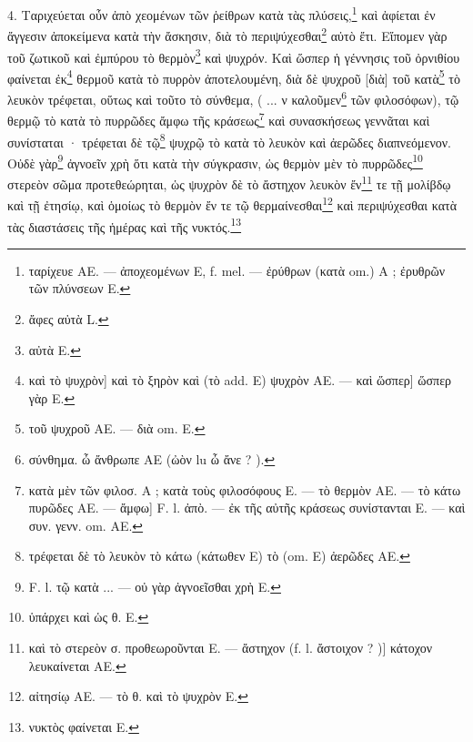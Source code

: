 \documentclass[a4paper, 11pt, oneside, polutonikogreek, french]{article}
\begin{document}
4. Ταριχεύεται οὖν ἀπὸ χεομένων τῶν ῥείθρων κατὰ τὰς πλύσεις,\footnote{ταρίχευε AE. --- ἀποχεομένων E, f. mel. --- ἐρύθρων (κατὰ om.) A ; ἐρυθρῶν τῶν πλύνσεων E.} καὶ ἀφίεται ἐν ἄγγεσιν ἀποκείμενα κατὰ τὴν ἄσκησιν, διὰ τὸ περιψύχεσθαι\footnote{ἄφες αὐτὰ L.} αὐτὸ ἔτι. Εἴπομεν γὰρ τοῦ ζωτικοῦ καὶ ἐμπύρου τὸ θερμὸν\footnote{αὐτὰ E.} καὶ ψυχρόν. Καὶ ὥσπερ ἡ γέννησις τοῦ ὀρνιθίου φαίνεται ἐκ\footnote{καὶ τὸ ψυχρὸν] καὶ τὸ ξηρὸν καὶ (τὸ add. E) ψυχρὸν AE. --- καὶ ὥσπερ] ὥσπερ γὰρ E.} θερμοῦ κατὰ τὸ πυρρὸν ἀποτελουμένη, διὰ δὲ ψυχροῦ [διὰ] τοῦ κατὰ\footnote{τοῦ ψυχροῦ AE. --- διὰ om. E.} τὸ λευκὸν τρέφεται, οὕτως καὶ τοῦτο τὸ σύνθεμα, ( ... ν καλοῦμεν\footnote{σύνθημα. ὦ ἄνθρωπε AE (ὠὸν lu ὦ ἄνε ? ).} τῶν φιλοσόφων), τῷ θερμῷ τὸ κατὰ τὸ πυρρῶδες ἄμφω τῆς κράσεως\footnote{κατὰ μὲν τῶν φιλοσ. A ; κατὰ τοὺς φιλοσόφους E. --- τὸ θερμὸν AE. --- τὸ κάτω πυρῶδες AE. --- ἄμφω] F. l. ἀπὸ. --- ἐκ τῆς αὐτῆς κράσεως συνίστανται E. --- καὶ συν. γενν. om. AE.} καὶ συνασκήσεως γεννᾶται καὶ συνίσταται · τρέφεται δὲ τῷ\footnote{τρέφεται δὲ τὸ λευκὸν τὸ κάτω (κάτωθεν E) τὸ (om. E) ἀερῶδες AE.} ψυχρῷ τὸ κατὰ τὸ λευκὸν καὶ ἀερῶδες διαπνεόμενον. Οὐδὲ γὰρ\footnote{F. l. τῷ κατὰ ... --- οὐ γὰρ ἀγνοεῖσθαι χρὴ E.} ἀγνοεῖν χρὴ ὅτι κατὰ τὴν σύγκρασιν, ὡς θερμὸν μὲν τὸ πυρρῶδες\footnote{ὑπάρχει καὶ ὡς θ. E.} στερεὸν σῶμα προτεθεώρηται, ὡς ψυχρὸν δὲ τὸ ἄστηχον λευκὸν ἔν\footnote{καὶ τὸ στερεὸν σ. προθεωροῦνται E. --- ἄστηχον (f. l. ἄστοιχον ? )] κάτοχον λευκαίνεται AE.} τε τῇ μολίβδῳ καὶ τῇ ἐτησίῳ, καὶ ὁμοίως τὸ θερμὸν ἔν τε τῷ θερμαίνεσθαι\footnote{αἰτησίῳ AE. --- τὸ θ. καὶ τὸ ψυχρὸν E.} καὶ περιψύχεσθαι κατὰ τὰς διαστάσεις τῆς ἡμέρας καὶ τῆς νυκτός.\footnote{νυκτὸς φαίνεται E.}
\end{document}
